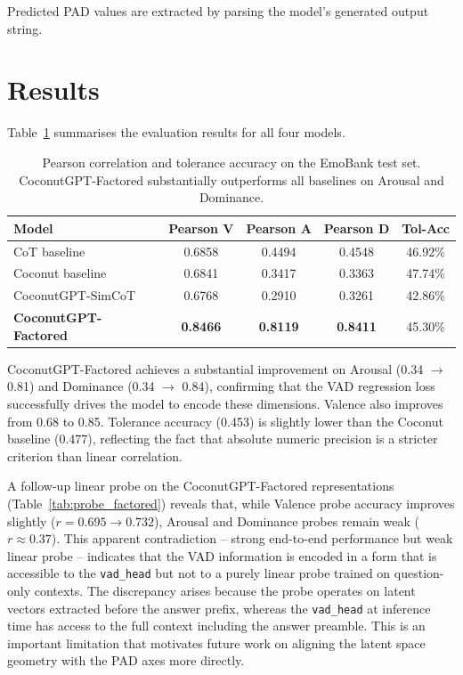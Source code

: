 \documentclass[12pt,twoside]{report}
\begin{document}
Predicted PAD values are extracted by parsing the model's generated output string.

\section{Results}

Table~\ref{tab:main_results} summarises the evaluation results for all four models.

\begin{table}[H]
\centering
\begin{tabular}{lcccc}
\toprule
\textbf{Model} & \textbf{Pearson V} & \textbf{Pearson A} & \textbf{Pearson D} & \textbf{Tol-Acc} \\
\midrule
CoT baseline             & 0.6858 & 0.4494 & 0.4548 & 46.92\% \\
Coconut baseline         & 0.6841 & 0.3417 & 0.3363 & 47.74\% \\
CoconutGPT-SimCoT        & 0.6768 & 0.2910 & 0.3261 & 42.86\% \\
\textbf{CoconutGPT-Factored} & \textbf{0.8466} & \textbf{0.8119} & \textbf{0.8411} & 45.30\% \\
\bottomrule
\end{tabular}
\caption{Pearson correlation and tolerance accuracy on the EmoBank test set. CoconutGPT-Factored substantially outperforms all baselines on Arousal and Dominance.}
\label{tab:main_results}
\end{table}

CoconutGPT-Factored achieves a substantial improvement on Arousal (0.34 $\to$ 0.81) and Dominance (0.34 $\to$ 0.84), confirming that the VAD regression loss successfully drives the model to encode these dimensions.
Valence also improves from 0.68 to 0.85.
Tolerance accuracy (0.453) is slightly lower than the Coconut baseline (0.477), reflecting the fact that absolute numeric precision is a stricter criterion than linear correlation.

A follow-up linear probe on the CoconutGPT-Factored representations (Table~\ref{tab:probe_factored}) reveals that, while Valence probe accuracy improves slightly ($r = 0.695 \to 0.732$), Arousal and Dominance probes remain weak ($r \approx 0.37$).
This apparent contradiction -- strong end-to-end performance but weak linear probe -- indicates that the VAD information is encoded in a form that is accessible to the \texttt{vad\_head} but not to a purely linear probe trained on question-only contexts.
The discrepancy arises because the probe operates on latent vectors extracted before the answer prefix, whereas the \texttt{vad\_head} at inference time has access to the full context including the answer preamble.
This is an important limitation that motivates future work on aligning the latent space geometry with the PAD axes more directly.
\end{document}
